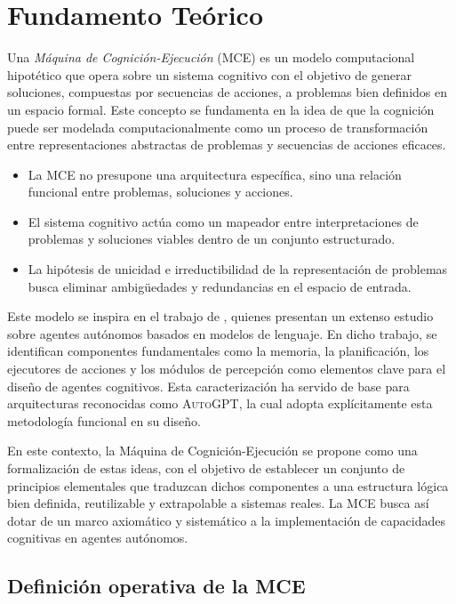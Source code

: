 \chapter{Fundamento Teórico}

Una \textit{Máquina de Cognición-Ejecución} (MCE) es un modelo computacional
hipotético que opera sobre un sistema cognitivo con el objetivo de generar
soluciones, compuestas por secuencias de acciones, a problemas bien definidos en
un espacio formal. Este concepto se fundamenta en la idea de que la cognición
puede ser modelada computacionalmente como un proceso de transformación entre
representaciones abstractas de problemas y secuencias de acciones eficaces.

\begin{itemize}
 \item La MCE no presupone una arquitectura específica, sino una
relación funcional entre problemas, soluciones y acciones.
 \item El sistema
cognitivo actúa como un mapeador entre interpretaciones de problemas y
soluciones viables dentro de un conjunto estructurado.
 \item La hipótesis de
unicidad e irreductibilidad de la representación de problemas busca eliminar
ambigüedades y redundancias en el espacio de entrada.
 \end{itemize}

Este modelo se inspira en el trabajo de \citet{wang2024survey}, quienes
presentan un extenso estudio sobre agentes autónomos basados en modelos de
lenguaje. En dicho trabajo, se identifican componentes fundamentales como la
memoria, la planificación, los ejecutores de acciones y los módulos de
percepción como elementos clave para el diseño de agentes cognitivos. Esta
caracterización ha servido de base para arquitecturas reconocidas como
\textsc{AutoGPT}, la cual adopta explícitamente esta metodología funcional en su
diseño. 

En este contexto, la Máquina de Cognición-Ejecución se
propone como una formalización de estas ideas, con el objetivo de establecer un
conjunto de principios elementales que traduzcan dichos componentes a una
estructura lógica bien definida, reutilizable y extrapolable a sistemas reales.
La MCE busca así dotar de un marco axiomático y sistemático a la implementación
de capacidades cognitivas en agentes autónomos.

\section{Definición operativa de la MCE}

